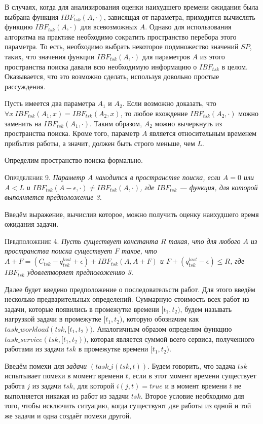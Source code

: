 \documentclass[14pt]{matmex-diploma-custom}
\begin{document}
В случаях, когда для анализирования оценки наихудшего времени ожидания была выбрана функция $IBF_{tsk}(A,\cdot)$,
  зависящая от параметра, приходится вычислять функцию $IBF_{tsk}(A,\cdot)$ для всевозможных $A$. 
  Однако для использования алгоритма на практике необходимо сократить пространство перебора этого параметра. 
  То есть, необходимо выбрать некоторое подмножество значений $SP$, таких, что значения 
  функции $IBF_{tsk}(A,\cdot)$ для параметров $A$ из этого пространства поиска давали 
  всю необходимую информацию о $IBF_{tsk}$ в целом. Оказывается, что 
  это возможно сделать, используя довольно простые рассуждения. 

Пусть имеется два параметра $A_1$ и $A_2$. Если возможно доказать, что 
  $\forall x \ IBF_{tsk}(A_1,x) = IBF_{tsk}(A_2, x)$, то любое вхождение $IBF_{tsk}(A_2, \cdot)$ 
  можно заменить на $IBF_{tsk}(A_1,\cdot)$. 
  Таким образом, $A_2$ можно вычеркнуть из пространства поиска. 
  Кроме того, параметр $A$ является относительным временем прибытия работы, 
  а значит, должен быть строго меньше, чем $L$.

Определим пространство поиска формально.

\textsc{Определение 9.} 
\textit{Параметр $A$ находится в пространстве поиска, если $A = 0 $ или $A < L$ и $IBF_{tsk}(A - \epsilon, \cdot) \neq IBF_{tsk}(A,\cdot)$, где $IBF_{tsk}$ --- функция, для которой выполняется предположение 3. }

Введём выражение, вычислив которое, можно получить оценку наихудшего время ожидания задачи. 

\textsc{Предположение 4.}
\textit{Пусть существует константа $R$ такая, что для любого $A$ из пространства 
  поиска существует $F$ такое, что
  $A + F = (C_{tsk} - q_{tsk}^{last} +\epsilon) + IBF_{tsk}(A, A + F)$ и $F + (q_{tsk}^{last} - \epsilon) \leq R$, 
  где $IBF_{tsk}$ удовлетворяет предположению 3. } 

Далее будет введено предположение о последовательсти работ. Для этого введём 
  несколько предварительных определений. Суммарную стоимость всех работ из задачи, 
  которые появились в промежутке времени $[t_1, t_2)$, будем называть нагрузкой задачи 
  в промежутке $[t_1, t_2)$, которую обозначим как $task\_workload(tsk, [t_1, t_2))$. 
  Аналогичным образом определим функцию $task\_service(tsk, [t_1, t_2))$, 
  которая является суммой всего сервиса, полученного работами из задачи $tsk$ в промежутке 
  времени $[t_1, t_2)$.

Введём помехи для \textit{задачи} $(task\_i(tsk,t))$. Будем говорить, что задача $tsk$ испытывает помехи 
  в момент времени $t$, если в этот момент времени существует работа $j$ из задачи $tsk$, 
  для которой $i(j,t) = true$ и в момент времени $t$ не выполняется никакая из работ из задачи $tsk$. 
  Второе условие необходимо для того, чтобы исключить ситуацию, когда существуют две работы из одной и той же 
  задачи и одна создаёт помехи другой.
\end{document}
